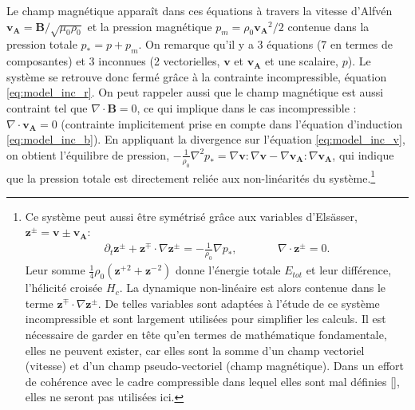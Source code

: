 Le champ magnétique apparaît dans ces équations à travers la vitesse d'Alfvén $\boldsymbol{v_A} = \boldsymbol{B}/\sqrt{\mu_0 \rho_0}$ et la pression magnétique $p_m = \rho_0 \boldsymbol{v_A}^2 /2$ contenue dans la pression totale $p_* = p + p_m$. On remarque qu'il y a 3 équations (7 en termes de composantes) et 3 inconnues (2 vectorielles, $\boldsymbol{v}$ et $\boldsymbol{v_A}$ et une scalaire, $p$). Le système se retrouve donc fermé grâce à la contrainte incompressible, équation \eqref{eq:model_inc_r}. On peut rappeler aussi que le champ magnétique est aussi contraint tel que $\nabla \cdot \boldsymbol{B} = 0$, ce qui implique dans le cas incompressible : $\nabla \cdot \boldsymbol{v_A} = 0$ (contrainte implicitement prise en compte dans l'équation d'induction \eqref{eq:model_inc_b}). En appliquant la divergence sur l'équation \eqref{eq:model_inc_v}, on obtient l'équilibre de pression, $- \frac{1}{\rho_0}\nabla^2 p_* = \nabla \boldsymbol{v} : \nabla \boldsymbol{v} -  \nabla \boldsymbol{v_A} : \nabla \boldsymbol{v_A} $, qui indique que la pression totale est directement reliée aux non-linéarités du système.\footnote{Ce système peut aussi être symétrisé grâce aux variables d'Elsässer, $\boldsymbol{z^{\pm}} = \boldsymbol{v} \pm \boldsymbol{v_A}$: 
\begin{eqnarray}
\partial_t \boldsymbol{z^{\pm}} + \boldsymbol{z^{\mp}} \cdot \nabla \boldsymbol{z^{\pm}} = - \frac{1}{\rho_0} \nabla p_* , &\qquad& \nabla \cdot \boldsymbol{z^{\pm}} = 0 .
\end{eqnarray}
Leur somme $\frac{1}{4}\rho_0 (\boldsymbol{z^{+}}{}^2 + \boldsymbol{z^{-}}{}^2)$ donne l'énergie totale $E_{tot}$ et leur différence, l'hélicité croisée  $H_c$. La dynamique non-linéaire est alors contenue dans le terme $\boldsymbol{z^{\mp}} \cdot \nabla \boldsymbol{z^{\pm}}$. De telles variables sont adaptées à l'étude de ce système incompressible et sont largement utilisées pour simplifier les calculs. Il est nécessaire de garder en tête qu'en termes de mathématique fondamentale, elles ne peuvent exister, car elles sont la somme d'un champ vectoriel (vitesse) et d'un champ pseudo-vectoriel (champ magnétique). Dans un effort de cohérence avec le cadre compressible dans lequel elles sont mal définies [\cite{magyar_nature_2019}], elles ne seront pas utilisées ici.}

